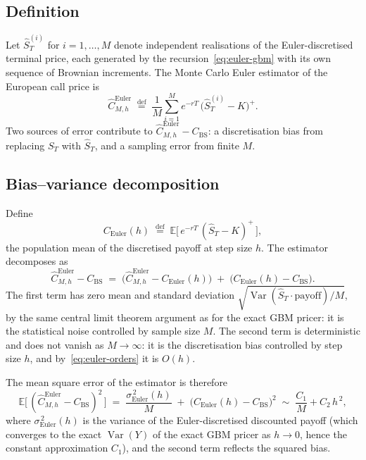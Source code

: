 \documentclass[11pt,a4paper]{article}
\theoremstyle{plain}
\theoremstyle{definition}
\theoremstyle{remark}
\newcommand{\E}{\mathbb{E}}
\newcommand{\Var}{\operatorname{Var}}
\newcommand{\eqdef}{\overset{\mathrm{def}}{=}}
\begin{document}
\subsection{Definition}

Let $\hat S_T^{(i)}$ for $i = 1, \ldots, M$ denote independent
realisations of the Euler-discretised terminal price, each generated
by the recursion~\eqref{eq:euler-gbm} with its own sequence of
Brownian increments. The Monte Carlo Euler estimator of the
European call price is
\begin{equation}
\label{eq:estimator}
\hat C_{M, h}^{\mathrm{Euler}} \;\eqdef\; \frac{1}{M} \sum_{i=1}^{M}
e^{-rT}\, \big(\hat S_T^{(i)} - K\big)^+ .
\end{equation}
Two sources of error contribute to $\hat C_{M, h}^{\mathrm{Euler}}
- C_{\mathrm{BS}}$: a discretisation bias from replacing $S_T$ with
$\hat S_T$, and a sampling error from finite $M$.

\subsection{Bias--variance decomposition}

Define
\begin{equation}
C_{\mathrm{Euler}}(h) \;\eqdef\; \E\big[\,e^{-rT}\,(\hat S_T - K)^+\,\big],
\end{equation}
the population mean of the discretised payoff at step size $h$. The
estimator decomposes as
\begin{equation}
\hat C_{M, h}^{\mathrm{Euler}} - C_{\mathrm{BS}}
\;=\; \big(\hat C_{M, h}^{\mathrm{Euler}} - C_{\mathrm{Euler}}(h)\big)
\;+\; \big(C_{\mathrm{Euler}}(h) - C_{\mathrm{BS}}\big).
\end{equation}
The first term has zero mean and standard deviation
$\sqrt{\Var(\hat S_T \cdot \text{payoff}) / M}$, by the same central
limit theorem argument as for the exact GBM pricer: it is the
statistical noise
controlled by sample size $M$. The second term is deterministic and
does not vanish as $M \to \infty$: it is the discretisation bias
controlled by step size $h$, and by~\eqref{eq:euler-orders} it is
$O(h)$.

The mean square error of the estimator is therefore
\begin{equation}
\label{eq:mse-decomp}
\E\big[\,(\hat C_{M, h}^{\mathrm{Euler}} - C_{\mathrm{BS}})^2\,\big]
\;=\; \frac{\sigma_{\mathrm{Euler}}^{\,2}(h)}{M} \;+\;
\big(C_{\mathrm{Euler}}(h) - C_{\mathrm{BS}}\big)^{\!2}
\;\sim\; \frac{C_1}{M} + C_2\, h^{\,2},
\end{equation}
where $\sigma_{\mathrm{Euler}}^{\,2}(h)$ is the variance of the
Euler-discretised discounted payoff (which converges to the exact
$\Var(Y)$ of the exact GBM pricer as $h \to 0$, hence the constant
approximation $C_1$), and the second term reflects the squared bias.
\end{document}
